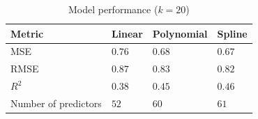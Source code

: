 \documentclass[12pt,a4paper]{article}
\begin{document}
\begin{appendices}
    \begin{table}[h]
        \centering
        \begin{tabular}{|l|l|l|l|}
            \hline
            \textbf{Metric}      & \textbf{Linear} & \textbf{Polynomial} & \textbf{Spline} \\
            \hline
            MSE                  & $0.76$          & $0.68$              & $0.67$          \\
            RMSE                 & $0.87$          & $0.83$              & $0.82$          \\
            $R^{2}$              & $0.38$          & $0.45$              & $0.46$          \\
            Number of predictors & $52$            & $60$                & $61$            \\
            \hline
        \end{tabular}
        \caption{Model performance ($k=20$)}
        \label{tab:model-performance}
    \end{table}


\end{appendices}
\end{document}
